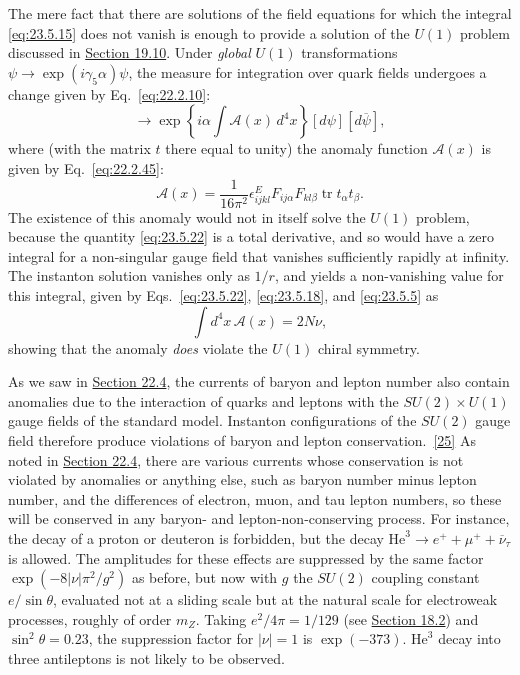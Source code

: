 The mere fact that there are solutions of the field equations for which
the integral \eqref{eq:23.5.15} does not vanish is enough to provide a
solution of the $U(1)$ problem discussed in \hyperref[sec:19.10]{Section 19.10}. Under
\emph{global} $U(1)$ transformations
$\psi\to\exp(i\gamma_5\alpha)\psi$, the measure for integration over
quark fields undergoes a change given by Eq.~\eqref{eq:22.2.10}:
\begin{equation}
[d\psi][d\overline\psi]\longrightarrow
\exp\left\{i\alpha\int\mathcal A(x)\,d^4x\right\}
[d\psi][d\overline\psi],
\tag{23.5.21}\label{eq:23.5.21}
\end{equation}
where (with the matrix $t$ there equal to unity) the anomaly function
$\mathcal A(x)$ is given by Eq.~\eqref{eq:22.2.45}:
\begin{equation}
\mathcal A(x)=\frac{1}{16\pi^2}\epsilon^E_{ijkl}
F_{ij\alpha}F_{kl\beta}\operatorname{tr}t_\alpha t_\beta.
\tag{23.5.22}\label{eq:23.5.22}
\end{equation}
The existence of this anomaly would not in itself solve the $U(1)$
problem, because the quantity \eqref{eq:23.5.22} is a total derivative,
and so would have a zero integral for a non-singular gauge field that
vanishes sufficiently rapidly at infinity. The instanton solution
vanishes only as $1/r$, and yields a non-vanishing value for this
integral, given by Eqs.~\eqref{eq:23.5.22}, \eqref{eq:23.5.18}, and
\eqref{eq:23.5.5} as
\begin{equation}
\int d^4x\,\mathcal A(x)=2N\nu,
\tag{23.5.23}\label{eq:23.5.23}
\end{equation}
showing that the anomaly \emph{does} violate the $U(1)$ chiral symmetry.

As we saw in \hyperref[sec:22.4]{Section 22.4}, the currents of baryon and lepton number also
contain anomalies due to the interaction of quarks and leptons with the
$SU(2)\times U(1)$ gauge fields of the standard model. Instanton
configurations of the $SU(2)$ gauge field therefore produce violations
of baryon and lepton conservation.~\hyperref[ch23-ref-25]{[25]} As noted
in \hyperref[sec:22.4]{Section 22.4}, there are various currents whose conservation is not
violated by anomalies or anything else, such as baryon number minus
lepton number, and the differences of electron, muon, and tau lepton
numbers, so these will be conserved in any baryon- and
lepton-non-conserving process. For instance, the decay of a proton or
deuteron is forbidden, but the decay
$\mathrm{He}^3\to e^++\mu^++\overline\nu_\tau$ is allowed. The
amplitudes for these effects are suppressed by the same factor
$\exp(-8|\nu|\pi^2/g^2)$ as before, but now with $g$ the $SU(2)$
coupling constant $e/\sin\theta$, evaluated not at a sliding scale but at
the natural scale for electroweak processes, roughly of order $m_Z$.
Taking $e^2/4\pi=1/129$ (see \hyperref[sec:18.2]{Section 18.2}) and
$\sin^2\theta=0.23$, the suppression factor for $|\nu|=1$ is
$\exp(-373)$. $\mathrm{He}^3$ decay into three antileptons is not likely
to be observed.

